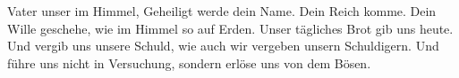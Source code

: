 \lettrine[lines=3]{V}{}ater unser im Himmel,
Geheiligt werde dein Name.
Dein Reich komme.
Dein Wille geschehe,
wie im Himmel so auf Erden.
Unser tägliches Brot gib uns heute.
Und vergib uns unsere Schuld,
wie auch wir vergeben unsern Schuldigern.
Und führe uns nicht in Versuchung,
sondern erlöse uns von dem Bösen.
